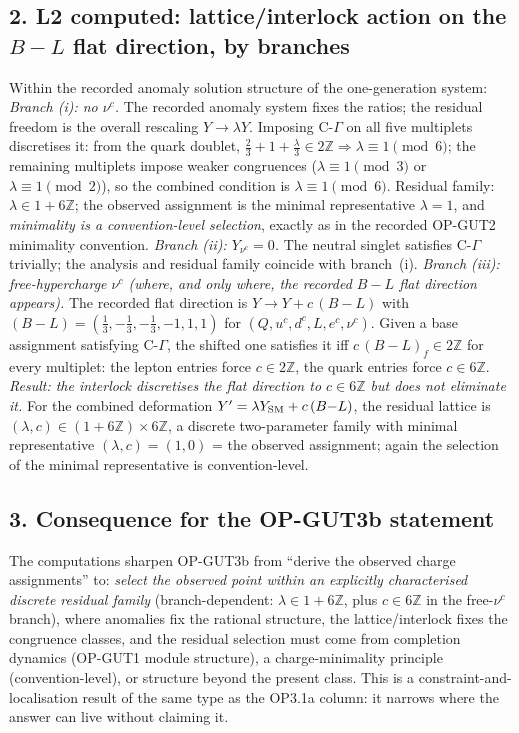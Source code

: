 \subsection*{2. L2 computed: lattice/interlock action on the
$B{-}L$ flat direction, by branches}
Within the recorded anomaly solution structure of the
one-generation system:
\emph{Branch (i): no $\nu^c$.}
The recorded anomaly system fixes the ratios; the residual
freedom is the overall rescaling $Y\to\lambda Y$.
Imposing C-$\Gamma$ on all five multiplets discretises it:
from the quark doublet,
$\tfrac23+1+\tfrac\lambda3\in2\mathbb Z\Rightarrow
\lambda\equiv1\pmod 6$; the remaining multiplets impose weaker
congruences ($\lambda\equiv1\pmod3$ or $\lambda\equiv1\pmod2$),
so the combined condition is $\lambda\equiv1\pmod 6$.
Residual family: $\lambda\in1+6\mathbb Z$; the observed
assignment is the minimal representative $\lambda=1$, and
\emph{minimality is a convention-level selection}, exactly as in
the recorded OP-GUT2 minimality convention.
\emph{Branch (ii): $Y_{\nu^c}=0$.}
The neutral singlet satisfies C-$\Gamma$ trivially; the analysis
and residual family coincide with branch~(i).
\emph{Branch (iii): free-hypercharge $\nu^c$ (where, and only
where, the recorded $B{-}L$ flat direction appears).}
The recorded flat direction is $Y\to Y+c\,(B{-}L)$ with
$(B{-}L)=(\tfrac13,-\tfrac13,-\tfrac13,-1,1,1)$ for
$(Q,u^c,d^c,L,e^c,\nu^c)$.
Given a base assignment satisfying C-$\Gamma$, the shifted one
satisfies it iff $c\,(B{-}L)_f\in2\mathbb Z$ for every multiplet:
the lepton entries force $c\in2\mathbb Z$, the quark entries
force $c\in6\mathbb Z$.
\emph{Result: the interlock discretises the flat direction to
$c\in6\mathbb Z$ but does not eliminate it.}
For the combined deformation $Y'=\lambda Y_{\rm SM}+c\,(B{-}L)$,
the residual lattice is
$(\lambda,c)\in(1+6\mathbb Z)\times6\mathbb Z$, a discrete
two-parameter family with minimal representative
$(\lambda,c)=(1,0)$ = the observed assignment; again the
selection of the minimal representative is convention-level.

\subsection*{3. Consequence for the OP-GUT3b statement}
The computations sharpen OP-GUT3b from ``derive the observed
charge assignments'' to: \emph{select the observed point within
an explicitly characterised discrete residual family}
(branch-dependent: $\lambda\in1+6\mathbb Z$, plus $c\in6\mathbb Z$
in the free-$\nu^c$ branch), where anomalies fix the rational
structure, the lattice/interlock fixes the congruence classes,
and the residual selection must come from completion dynamics
(OP-GUT1 module structure), a charge-minimality principle
(convention-level), or structure beyond the present class.
This is a constraint-and-localisation result of the same type as
the OP3.1a column: it narrows where the answer can live without
claiming it.

